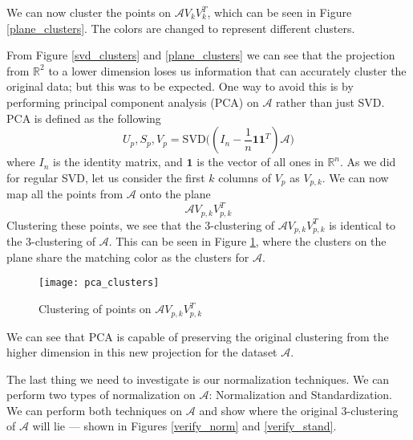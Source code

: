 \documentclass[a4paper, 11pt]{article} %
\begin{document}
We can now cluster the points on $\mathcal{A}V_kV_k^T$, which can be seen in Figure \ref{plane_clusters}. The colors are changed to represent different clusters.

From Figure \ref{svd_clusters} and \ref{plane_clusters} we can see that the projection from $\mathbb{R}^2$ to a lower dimension loses us information that can accurately cluster the original data; but this was to be expected. One way to avoid this is by performing principal component analysis (PCA) on  $\mathcal{A}$ rather than just SVD. PCA is defined as the following
$$U_p, S_p, V_p = \text{SVD}\big((I_n - \frac{1}{n}\mathbf{1}\mathbf{1}^T)\mathcal{A}\big)$$
where $I_n$ is the identity matrix, and $\mathbf{1}$ is the vector of all ones in $\mathbb{R}^n$. As we did for regular SVD, let us consider the first $k$ columns of $V_p$ as $V_{p,k}$. We can now map all the points from $\mathcal{A}$ onto the plane
$$\mathcal{A}V_{p,k}V_{p,k}^T$$
Clustering these points, we see that the 3-clustering of $\mathcal{A}V_{p,k}V_{p,k}^T$ is identical to the 3-clustering of $\mathcal{A}$. This can be seen in Figure \ref{pca_clusters}, where the clusters on the plane share the matching color as the clusters for $\mathcal{A}$. 
\begin{figure}[H]
\centering
\texttt{[image: pca\_clusters]}
\caption{Clustering of points on $\mathcal{A}V_{p,k}V_{p,k}^T$}
\label{pca_clusters}
\end{figure}
We can see that PCA is capable of preserving the original clustering from the higher dimension in this new projection for the dataset $\mathcal{A}$. 

The last thing we need to investigate is our normalization techniques. We can perform two types of normalization on $\mathcal{A}$: Normalization and Standardization. We can perform both techniques on $\mathcal{A}$ and show where the original 3-clustering of $\mathcal{A}$ will lie --- shown in Figures \ref{verify_norm} and \ref{verify_stand}.
\end{document}
